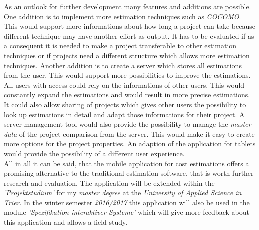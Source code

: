 As an outlook for further development many features and additions are possible. One addition is to implement more estimation techniques such as \textit{COCOMO}. This would support more informations about how long a project can take because different technique may have another effort as output. It has to be evaluated if as a consequent it is needed to make a project transferable to other estimation techniques or if projects need a different structure which allows more estimation techniques. Another addition is to create a server which stores all estimations from the user. This would support more possibilities to improve the estimations. All users with access could rely on the informations of other users. This would constantly expand the estimations and would result in more precise estimations. It could also allow sharing of projects which gives other users the possibility to look up estimations in detail and adapt those informations for their project. A server management tool would also provide the possibility to manage the \textit{master data} of the project comparison from the server. This would make it easy to create more options for the project properties. An adaption of the application for tablets would provide the possibility of a different user experience.\\
All in all it can be said, that the mobile application for cost estimations offers a promising alternative to the traditional estimation software, that is worth further research and evaluation. The application will be extended within the \textit{'Projektstudium'} for my \textit{master degree} at the \textit{University of Applied Science in Trier}. In the winter semester \textit{2016/2017} this application will also be used in the module \textit{'Spezifikation interaktiver Systeme'} which will give more feedback about this application and allows a field study.